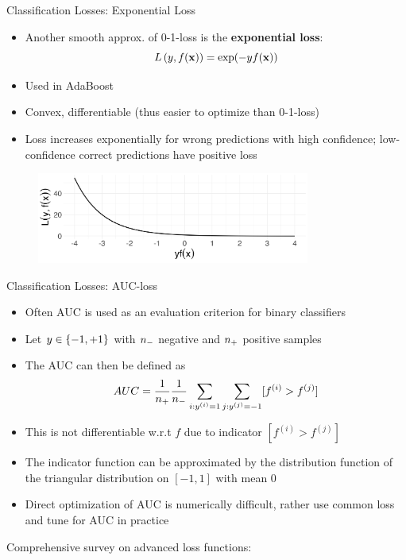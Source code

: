 \documentclass[11pt,compress,t,notes=noshow, xcolor=table]{beamer}
\begin{document}
\begin{vbframe}{Classification Losses: Exponential Loss}


\begin{itemize}
\item Another smooth 
approx. of 0-1-loss is the \textbf{exponential loss}:
$$\Lxy = \exp(-y\fx)$$ 
\item Used in AdaBoost
\item Convex, differentiable (thus easier to optimize than 0-1-loss)
\item Loss increases exponentially for wrong predictions with high confidence; low-confidence correct predictions have positive loss
\end{itemize}


\begin{figure}
\includegraphics[width = 0.8\textwidth]{figure/exponential.png}
\end{figure}

\end{vbframe}

\begin{vbframe}{Classification Losses: AUC-loss}

\begin{itemize}
\item Often AUC is used as an evaluation criterion for binary classifiers
\item Let $y \in \setmp$ with $\nn$ negative and $\np$ positive samples %
\item The AUC can then be defined as
$$AUC = \frac{1}{\np} \frac{1}{\nn} \sum_{i: \yi = 1} \sum_{j: \yi[j] = -1} [f^{(i)} > f^{(j)}]$$
\item This is not differentiable w.r.t $f$ due to indicator $[f^{(i)} > f^{(j)}]$
\item The indicator function can be approximated by the distribution function of the triangular distribution on $[-1, 1]$ with mean $0$
\item Direct optimization of AUC is numerically difficult, rather use common loss and tune for AUC in practice

\end{itemize}

Comprehensive survey on advanced loss functions: 

\end{vbframe}





\endlecture
\end{document}
